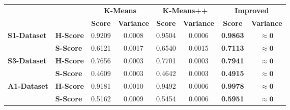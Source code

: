 \documentclass[10pt,twocolumn,letterpaper]{article}
\begin{document}
\begin{table}
    \centering
    \begin{tabular}{ll c c c c c c}
        \toprule
                                             &                  & \multicolumn{2}{c}{\textbf{K-Means}} & \multicolumn{2}{c}{\textbf{K-Means++}} & \multicolumn{2}{c}{\textbf{Improved}}                                                              \\
        \cmidrule(lr){3-4} \cmidrule(lr){5-6} \cmidrule(lr){7-8}
                                             &                  & \textbf{Score}                       & \textbf{Variance}                      & \textbf{Score}                        & \textbf{Variance} & \textbf{Score}  & \textbf{Variance}    \\
        \midrule
        \multirow{2}{*}{\textbf{S1-Dataset}} & \textbf{H-Score} & 0.9209                               & 0.0008                                 & 0.9504                                & 0.0006            & \textbf{0.9863} & $\mathbf{\approx 0}$ \\
                                             & \textbf{S-Score} & 0.6121                               & 0.0017                                 & 0.6540                                & 0.0015            & \textbf{0.7113} & $\mathbf{\approx 0}$ \\
        \midrule
        \multirow{2}{*}{\textbf{S3-Dataset}} & \textbf{H-Score} & 0.7656                               & 0.0003                                 & 0.7701                                & 0.0003            & \textbf{0.7941} & $\mathbf{\approx 0}$ \\
                                             & \textbf{S-Score} & 0.4609                               & 0.0003                                 & 0.4642                                & 0.0003            & \textbf{0.4915} & $\mathbf{\approx 0}$ \\
        \midrule
        \multirow{2}{*}{\textbf{A1-Dataset}} & \textbf{H-Score} & 0.9181                               & 0.0010                                 & 0.9492                                & 0.0006            & \textbf{0.9978} & $\mathbf{\approx 0}$ \\
                                             & \textbf{S-Score} & 0.5162                               & 0.0009                                 & 0.5454                                & 0.0006            & \textbf{0.5951} & $\mathbf{\approx 0}$ \\
        \midrule

\end{tabular}
\end{table}
\end{document}
